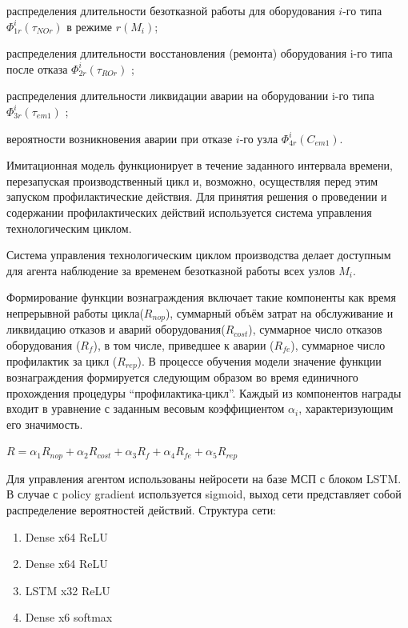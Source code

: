 \begin{textitemize}
    \item распределения длительности безотказной работы для оборудования $i$-го типа $\Phi_{1r}^i(\tau_{NOr})$  в режиме $r(M_i)$;
    \item распределения длительности восстановления (ремонта) оборудования i-го типа после отказа $\Phi_{2r}^i(\tau_{ROr})$ ;
    \item распределения длительности ликвидации аварии на оборудовании i-го типа $\Phi_{3r}^i(\tau_{em1})$ ;
    \item вероятности возникновения аварии при отказе $i$-го узла $\Phi_{4r}^i(C_{em1})$.
\end{textitemize}


Имитационная модель функционирует в течение заданного интервала времени, перезапуская производственный цикл и, возможно, осуществляя перед этим запуском профилактические действия. Для принятия решения о проведении и содержании профилактических действий используется система управления технологическим циклом.


Система управления технологическим циклом производства делает доступным для агента наблюдение за временем безотказной работы всех узлов $M_i$.


Формирование функции вознаграждения включает такие компоненты как время непрерывной работы цикла($R_{nop}$), суммарный объём затрат на обслуживание и ликвидацию отказов и аварий оборудования($R_{cost}$), суммарное число отказов оборудования ($R_{f}$), в том числе, приведшее к аварии ($R_{fe}$), суммарное число профилактик за цикл ($R_{rep}$). В процессе обучения модели значение функции вознаграждения формируется следующим образом во время единичного прохождения процедуры ``профилактика-цикл''. Каждый из компонентов награды входит в уравнение с заданным весовым коэффициентом $\alpha_i$, характеризующим его значимость.


$R=\alpha_1 R_{nop}+\alpha_2 R_{cost}+\alpha_3 R_{f}+\alpha_4 R_{fe}+\alpha_5 R_{rep}$

Для управления агентом использованы нейросети на базе МСП с блоком LSTM. В случае с policy gradient используется sigmoid, выход сети представляет собой распределение вероятностей действий.
Структура сети:

\begin{enumerate}
    \item Dense x64 ReLU
    \item Dense x64 ReLU
    \item LSTM x32 ReLU
    \item Dense x6 softmax

\end{enumerate}

